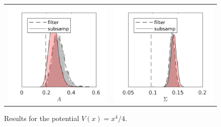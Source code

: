\documentclass[10pt]{article}
\begin{document}
\begin{figure}[t]
	\centering 
	\begin{tabular}{cc}
		\includegraphics[]{Figures/A_Quartic.png} & 	\includegraphics[]{Figures/S_Quartic.png}
	\end{tabular}
	\caption{Results for the potential $V(x)=x^4/4$.}
	\label{fig:Quartic}
\end{figure}
\end{document}
